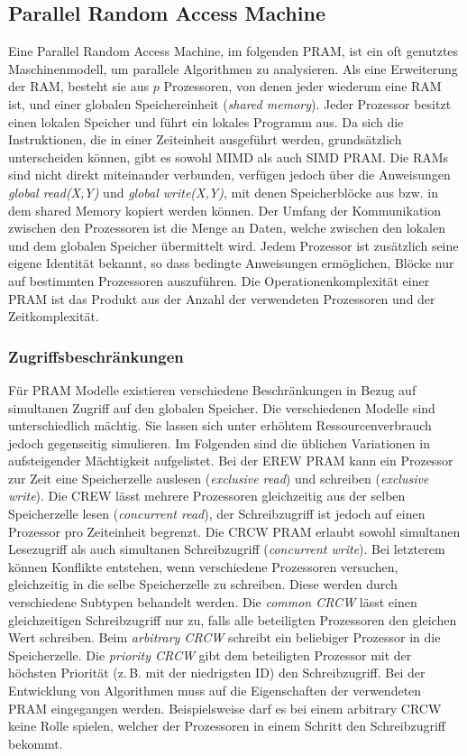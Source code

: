 \subsection{Parallel Random Access Machine}
Eine Parallel Random Access Machine, im folgenden PRAM, ist ein oft genutztes Maschinenmodell, um parallele Algorithmen zu analysieren.
Als eine Erweiterung der RAM, besteht sie aus $p$ Prozessoren, von denen jeder wiederum eine RAM ist, und einer globalen Speichereinheit (\emph{shared memory}).
Jeder Prozessor besitzt einen lokalen Speicher und führt ein lokales Programm aus.
Da sich die Instruktionen, die in einer Zeiteinheit ausgeführt werden, grundsätzlich unterscheiden können, gibt es sowohl MIMD als auch SIMD PRAM.
Die RAMs sind nicht direkt miteinander verbunden, verfügen jedoch über die Anweisungen \emph{global read(X,Y)} und \emph{global write(X,Y)}, mit denen Speicherblöcke aus bzw. in dem shared Memory kopiert werden können.
Der Umfang der Kommunikation zwischen den Prozessoren ist die Menge an Daten, welche zwischen den lokalen und dem globalen Speicher übermittelt wird.
Jedem Prozessor ist zusätzlich seine eigene Identität bekannt, so dass bedingte Anweisungen ermöglichen, Blöcke nur auf bestimmten Prozessoren auszuführen.
Die Operationenkomplexität einer PRAM ist das Produkt aus der Anzahl der verwendeten Prozessoren und der Zeitkomplexität.
\cite[S.9ff.]{jaja}


\subsubsection{Zugriffsbeschränkungen}
Für PRAM Modelle existieren verschiedene Beschränkungen in Bezug auf simultanen Zugriff auf den globalen Speicher.
Die verschiedenen Modelle sind unterschiedlich mächtig. Sie lassen sich unter erhöhtem Ressourcenverbrauch jedoch gegenseitig simulieren.
Im Folgenden sind die üblichen Variationen in aufsteigender Mächtigkeit aufgelistet.
Bei der EREW PRAM kann ein Prozessor zur Zeit eine Speicherzelle auslesen (\emph{exclusive read}) und schreiben (\emph{exclusive write}).
Die CREW lässt mehrere Prozessoren gleichzeitig aus der selben Speicherzelle lesen (\emph{concurrent read}), der Schreibzugriff ist jedoch auf einen Prozessor pro Zeiteinheit begrenzt.
Die CRCW PRAM erlaubt sowohl simultanen Lesezugriff als auch simultanen Schreibzugriff (\emph{concurrent write}).
Bei letzterem können Konflikte entstehen, wenn verschiedene Prozessoren versuchen, gleichzeitig in die selbe Speicherzelle zu schreiben. Diese werden durch verschiedene Subtypen behandelt werden.
Die \emph{common CRCW} lässt einen gleichzeitigen Schreibzugriff nur zu, falls alle beteiligten Prozessoren den gleichen Wert schreiben.
Beim \emph{arbitrary CRCW} schreibt ein beliebiger Prozessor in die Speicherzelle.
Die \emph{priority CRCW} gibt dem beteiligten Prozessor mit der höchsten Priorität (z.\,B. mit der niedrigsten ID) den Schreibzugriff.
Bei der Entwicklung von Algorithmen muss auf die Eigenschaften der verwendeten PRAM eingegangen werden. Beispielsweise darf es bei einem arbitrary CRCW keine Rolle spielen, welcher der Prozessoren in einem Schritt den Schreibzugriff bekommt.
\cite[S.14f.]{jaja}
